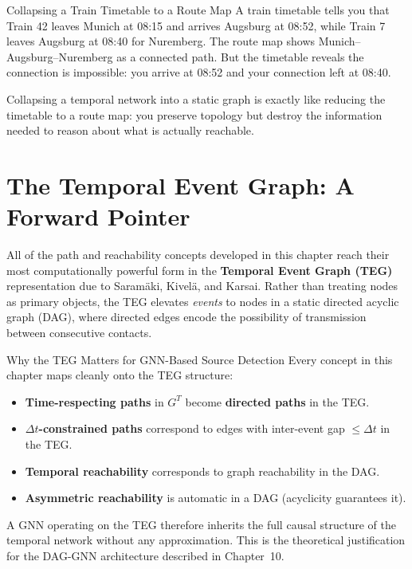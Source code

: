 \begin{analogybox}{Collapsing a Train Timetable to a Route Map}
A train timetable tells you that Train 42 leaves Munich at 08:15 and arrives Augsburg at 08:52,
while Train 7 leaves Augsburg at 08:40 for Nuremberg. The route map shows
Munich--Augsburg--Nuremberg as a connected path. But the timetable reveals the connection is
impossible: you arrive at 08:52 and your connection left at 08:40.

Collapsing a temporal network into a static graph is exactly like reducing the timetable to a
route map: you preserve topology but destroy the information needed to reason about what is
actually reachable.
\end{analogybox}

\section{The Temporal Event Graph: A Forward Pointer}
\label{sec:event_graph_pointer}

All of the path and reachability concepts developed in this chapter reach their most
computationally powerful form in the \textbf{Temporal Event Graph (TEG)} representation due
to Saram\"{a}ki, Kivel\"{a}, and Karsai. Rather than treating nodes as primary objects, the
TEG elevates \textit{events} to nodes in a static directed acyclic graph (DAG), where directed
edges encode the possibility of transmission between consecutive contacts.

\begin{keyinsight}{Why the TEG Matters for GNN-Based Source Detection}
Every concept in this chapter maps cleanly onto the TEG structure:
\begin{itemize}[noitemsep]
  \item \textbf{Time-respecting paths} in $G^T$ become \textbf{directed paths} in the TEG.
  \item \textbf{$\Delta t$-constrained paths} correspond to edges with inter-event gap
        $\leq \Delta t$ in the TEG.
  \item \textbf{Temporal reachability} corresponds to graph reachability in the DAG.
  \item \textbf{Asymmetric reachability} is automatic in a DAG (acyclicity guarantees it).
\end{itemize}
A GNN operating on the TEG therefore inherits the full causal structure of the temporal network
without any approximation. This is the theoretical justification for the DAG-GNN architecture
described in Chapter~10.
\end{keyinsight}

